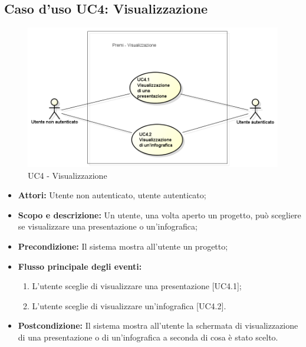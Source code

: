 \subsection{Caso d'uso UC4: Visualizzazione}
\begin{figure}[h] 
	\centering 
	\includegraphics[scale=0.45] {img/UC4.png}
	\caption{UC4 - Visualizzazione} 
\end{figure}

\begin{itemize}
	\item \textbf{Attori:} Utente non autenticato, utente autenticato;
	\item \textbf{Scopo e descrizione:} Un utente, una volta aperto un progetto, può scegliere se visualizzare una presentazione o un'\gls{infografica};
	\item \textbf{Precondizione:} Il sistema mostra all'utente un progetto;
	\item \textbf{Flusso principale degli eventi:}
	\begin{enumerate}
		\item L'utente sceglie di visualizzare una presentazione [UC4.1];
		\item L'utente sceglie di visualizzare un'\gls{infografica} [UC4.2].
	\end{enumerate}
	\item \textbf{Postcondizione:} Il sistema mostra all'utente la schermata di visualizzazione di una presentazione o di un'\gls{infografica} a seconda di cosa è stato scelto.
\end{itemize}

